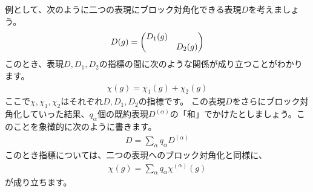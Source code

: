 \documentclass[uplatex,dvipdfmx,a4j]{jsarticle}
\begin{document}
例として、次のように二つの表現にブロック対角化できる表現$D$を考えましょう。
\begin{align}
	D(g) = \mqty(\dmat{D_1(g), D_2(g)})
\end{align}
このとき、表現$D, D_1, D_2$の指標の間に次のような関係が成り立つことがわかります。
\begin{align}
	\chi(g) = \chi_1(g) + \chi_2(g)
\end{align}
ここで$\chi, \chi_1, \chi_2$はそれぞれ$D, D_1, D_2$の指標です。
この表現$D$をさらにブロック対角化していった結果、$q_\alpha$個の既約表現$D^{(\alpha)}$の「和」でかけたとしましょう。このことを象徴的に次のように書きます。
\begin{align}
	D = \sum_\alpha q_\alpha D^{(\alpha)}
\end{align}
このとき指標については、二つの表現へのブロック対角化と同様に、
\begin{align}
	\chi(g) = \sum_\alpha q_\alpha \chi^{(\alpha)}(g) 
\end{align}
が成り立ちます。
\end{document}
